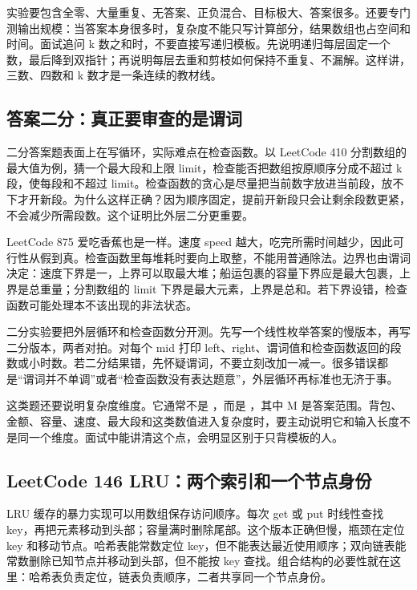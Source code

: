 实验要包含全零、大量重复、无答案、正负混合、目标极大、答案很多。还要专门测输出规模：当答案本身很多时，复杂度不能只写计算部分，结果数组也占空间和时间。面试追问 k 数之和时，不要直接写递归模板。先说明递归每层固定一个数，最后降到双指针；再说明每层去重和剪枝如何保持不重复、不漏解。这样讲，三数、四数和 k 数才是一条连续的教材线。

\subsection{答案二分：真正要审查的是谓词}

二分答案题表面上在写循环，实际难点在检查函数。以 LeetCode 410 分割数组的最大值为例，猜一个最大段和上限 limit，检查能否把数组按原顺序分成不超过 k 段，使每段和不超过 limit。检查函数的贪心是尽量把当前数字放进当前段，放不下才开新段。为什么这样正确？因为顺序固定，提前开新段只会让剩余段数更紧，不会减少所需段数。这个证明比外层二分更重要。

LeetCode 875 爱吃香蕉也是一样。速度 speed 越大，吃完所需时间越少，因此可行性从假到真。检查函数里每堆耗时要向上取整，不能用普通除法。边界也由谓词决定：速度下界是一，上界可以取最大堆；船运包裹的容量下界应是最大包裹，上界是总重量；分割数组的 limit 下界是最大元素，上界是总和。若下界设错，检查函数可能处理本不该出现的非法状态。

二分实验要把外层循环和检查函数分开测。先写一个线性枚举答案的慢版本，再写二分版本，两者对拍。对每个 mid 打印 left、right、谓词值和检查函数返回的段数或小时数。若二分结果错，先怀疑谓词，不要立刻改加一减一。很多错误都是“谓词并不单调”或者“检查函数没有表达题意”，外层循环再标准也无济于事。

这类题还要说明复杂度维度。它通常不是 ，而是 ，其中 M 是答案范围。背包、金额、容量、速度、最大段和这类数值进入复杂度时，要主动说明它和输入长度不是同一个维度。面试中能讲清这个点，会明显区别于只背模板的人。

\subsection{LeetCode 146 LRU：两个索引和一个节点身份}

LRU 缓存的暴力实现可以用数组保存访问顺序。每次 get 或 put 时线性查找 key，再把元素移动到头部；容量满时删除尾部。这个版本正确但慢，瓶颈在定位 key 和移动节点。哈希表能常数定位 key，但不能表达最近使用顺序；双向链表能常数删除已知节点并移动到头部，但不能按 key 查找。组合结构的必要性就在这里：哈希表负责定位，链表负责顺序，二者共享同一个节点身份。

